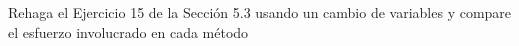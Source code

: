 Rehaga el Ejercicio 15 de la Sección 5.3 usando un cambio de variables y compare el esfuerzo involucrado en cada método
